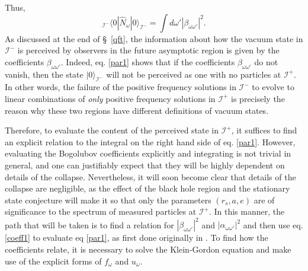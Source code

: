\documentclass[
12pt,		%
openright,	%
twoside,  %
a4paper,			%
chapter=TITLE,		%
english,			%
french,				%
spanish,			%
brazil				%
]{USPSC-classe/USPSC}
\begin{document}
Thus,
\begin{equation}\label{par1}
    _{{\mathscr{I}^-}}\langle0|\hat{N}_{\omega}|0\rangle_{\mathscr{I}^-}=\int d\omega'|\beta_{\omega\omega'}|^2.
\end{equation}
As discussed at the end of \S~\ref{qft}, the information about how the vacuum state in $\mathscr{I}^-$ is perceived by observers in the future asymptotic region is given by the coefficients $\beta_{\omega\omega'}$. Indeed, eq. \ref{par1} shows that if the coefficients $\beta_{\omega\omega'}$ do not vanish, then the state $|0\rangle_{\mathscr{I}^-}$ will not be perceived as one with no particles at $\mathscr{I}^+$. In other words, the failure of the positive frequency solutions in $\mathscr{I}^-$ to evolve to linear combinations of \textit{only} positive frequency solutions in $\mathscr{I}^+$ is precisely the reason why these two regions have different definitions of vacuum states. 

Therefore, to evaluate the content of the perceived state in $\mathscr{I}^+$, it suffices to find an explicit relation to the integral on the right hand side of eq. \ref{par1}. However, evaluating the Bogolubov coefficients explicitly and integrating is not trivial in general, and one can justifiably expect that they will be highly dependent on details of the collapse. Nevertheless, it will soon become clear that details of the collapse are negligible, as the effect of the black hole region and the stationary state conjecture will make it so that only the parameters $(r_s,a,e)$ are of significance to the spectrum of measured particles at $\mathscr{I}^+$. In this manner, the path that will be taken is to find a relation for $|\beta_{\omega\omega'}|^2$ and $|\alpha_{\omega\omega'}|^2$ and then use eq. \ref{coeff1} to evaluate eq \ref{par1}, as first done originally in \cite{Hawking1975}. To find how the coefficients relate, it is necessary to solve the Klein-Gordon equation and make use of the explicit forms of $f_{\omega}$ and $u_{\omega}$. 
\end{document}
